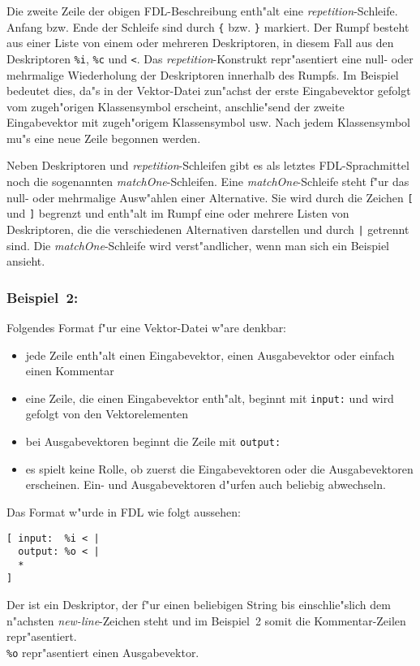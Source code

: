 Die zweite Zeile der obigen FDL-Beschreibung enth"alt eine 
{\it repetition}-Schleife.
Anfang bzw. Ende der Schleife sind durch {\tt \{} bzw. {\tt \}} markiert.
Der Rumpf besteht aus einer Liste von einem oder mehreren Deskriptoren,
in diesem Fall aus den Deskriptoren {\tt \%i}, {\tt \%c} und {\tt <}.  
Das {\it repetition}-Konstrukt repr"asentiert eine null- oder mehrmalige
Wiederholung der Deskriptoren innerhalb des Rumpfs.
Im Beispiel bedeutet dies, da"s in der Vektor-Datei zun"achst der
erste Eingabevektor gefolgt vom zugeh"origen Klassensymbol erscheint,
anschlie"send der zweite Eingabevektor mit zugeh"origem Klassensymbol
usw. 
Nach jedem Klassensymbol mu"s eine neue Zeile begonnen werden.

Neben Deskriptoren und {\it repetition}-Schleifen gibt es als letztes
FDL-Sprachmittel noch die sogenannten {\it matchOne}-Schleifen.
Eine {\it matchOne}-Schleife steht f"ur das null- oder mehrmalige
Ausw"ahlen einer Alternative.
Sie wird durch die Zeichen {\tt [} und {\tt ]} begrenzt und enth"alt im 
Rumpf eine oder mehrere Listen von Deskriptoren, die die
verschiedenen Alternativen darstellen und durch {\tt |} getrennt sind.
Die {\it matchOne}-Schleife wird verst"andlicher, wenn man sich ein
Beispiel ansieht.

\subsubsection*{Beispiel~2:}
Folgendes Format f"ur eine Vektor-Datei w"are denkbar:
\begin{itemize}
\item jede Zeile enth"alt einen Eingabevektor, einen Ausgabevektor oder
einfach einen Kommentar
\item eine Zeile, die einen Eingabevektor enth"alt, beginnt mit {\tt input:}
und wird gefolgt von den Vektorelementen
\item bei Ausgabevektoren beginnt die Zeile mit {\tt output:}
\item es spielt keine Rolle, ob zuerst die Eingabevektoren oder die
Ausgabevektoren erscheinen. 
Ein- und Ausgabevektoren d"urfen auch beliebig abwechseln.
\end{itemize}  
\begin{samepage}
Das Format w"urde in FDL wie folgt aussehen:
\begin{verbatim}
[ input:  %i < | 
  output: %o < | 
  * 
]
\end{verbatim}
\end{samepage}
Der {\tt *} ist ein Deskriptor, der f"ur einen beliebigen String bis
einschlie"slich dem
n"achsten {\it new-line}-Zeichen steht und im Beispiel~2 somit die
Kommentar-Zeilen repr"asentiert. \\
{\tt \%o} repr"asentiert einen Ausgabevektor. 

